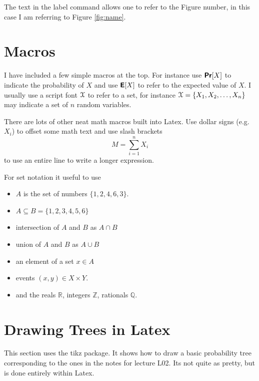 \documentclass[11pt]{article}
\renewcommand{\c}[1]{\ensuremath{\EuScript{#1}}}
\newcommand{\s}[1]{\textsf{#1}}
\newcommand{\E}{\textbf{\textsf{E}}}
\renewcommand{\Pr}{\textbf{\textsf{Pr}}}
\begin{document}
The text in the \s{label} command allows one to refer to the Figure number, in this case I am referring to Figure \ref{fig:name}.  

\section{Macros}
I have included a few simple macros at the top.  For instance use $\Pr[X]$ to indicate the probability of $X$ and use $\E[X]$ to refer to the expected value of $X$.  I usually use a script font $\c{X}$ to refer to a set, for instance $\c{X} = \{X_1, X_2, \ldots, X_n\}$ may indicate a set of $n$ random variables.  

There are lots of other neat math macros built into Latex.  Use dollar signs (e.g. $X_i$) to offset some math text and use slash brackets 
\[
M = \sum_{i=1}^n X_i
\]
to use an entire line to write a longer expression.  

For set notation it useful to use
\begin{itemize}
\item $A$ is the set of numbers $\{1, 2, 4, 6, 3\}$.
\item $A \subseteq B = \{1,2,3,4,5,6\}$
\item intersection of $A$ and $B$ as $A \cap B$
\item union of $A$ and $B$ as $A \cup B$
\item an element of a set $x \in A$
\item events $(x,y) \in X \times Y$.  
\item and the reals $\mathbb{R}$, integers $\mathbb{Z}$, rationals $\mathbb{Q}$.  
\end{itemize}


\section{Drawing Trees in Latex}
This section uses the tikz package.  It shows how to draw a basic probability tree corresponding to the ones in the notes for lecture L02.  Its not quite as pretty, but is done entirely within Latex.  
\end{document}
